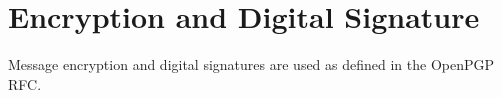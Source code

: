 \section{Encryption and Digital Signature}
\label{openpgp}
Message encryption and digital signatures are
used as defined in the OpenPGP RFC.\cite{rfc2440}

